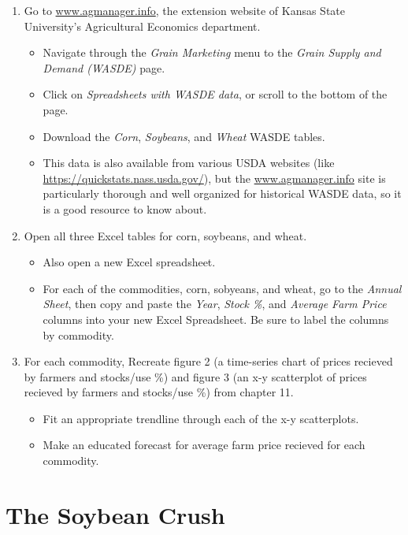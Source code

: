 \documentclass[
]{book}
\begin{document}
\begin{enumerate}
\def\labelenumi{\arabic{enumi}.}
\item
  Go to \url{www.agmanager.info}, the extension website of Kansas State University's Agricultural Economics department.

  \begin{itemize}
  \item
    Navigate through the \emph{Grain Marketing} menu to the \emph{Grain Supply and Demand (WASDE)} page.
  \item
    Click on \emph{Spreadsheets with WASDE data}, or scroll to the bottom of the page.
  \item
    Download the \emph{Corn}, \emph{Soybeans}, and \emph{Wheat} WASDE tables.
  \item
    This data is also available from various USDA websites (like \url{https://quickstats.nass.usda.gov/}), but the \href{agmanager.info}{www.agmanager.info} site is particularly thorough and well organized for historical WASDE data, so it is a good resource to know about.
  \end{itemize}
\item
  Open all three Excel tables for corn, soybeans, and wheat.

  \begin{itemize}
  \item
    Also open a new Excel spreadsheet.
  \item
    For each of the commodities, corn, sobyeans, and wheat, go to the \emph{Annual Sheet}, then copy and paste the \emph{Year}, \emph{Stock \%}, and \emph{Average Farm Price} columns into your new Excel Spreadsheet. Be sure to label the columns by commodity.
  \end{itemize}
\item
  For each commodity, Recreate figure 2 (a time-series chart of prices recieved by farmers and stocks/use \%) and figure 3 (an x-y scatterplot of prices recieved by farmers and stocks/use \%) from chapter 11.

  \begin{itemize}
  \item
    Fit an appropriate trendline through each of the x-y scatterplots.
  \item
    Make an educated forecast for average farm price recieved for each commodity.
  \end{itemize}
\end{enumerate}

\hypertarget{the-soybean-crush}{%
\chapter{The Soybean Crush}\label{the-soybean-crush}}
\end{document}
